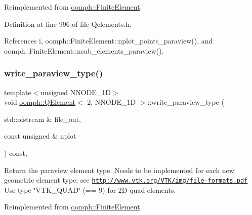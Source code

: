 Reimplemented from \hyperlink{classoomph_1_1FiniteElement_afed006dd5b9ab6bd613d8496e6048abf}{oomph\+::\+Finite\+Element}.



Definition at line 996 of file Qelements.\+h.



References i, oomph\+::\+Finite\+Element\+::nplot\+\_\+points\+\_\+paraview(), and oomph\+::\+Finite\+Element\+::nsub\+\_\+elements\+\_\+paraview().

\mbox{\label{classoomph_1_1QElement_3_012_00_01NNODE__1D_01_4_a2e5c926cfb3b0cf3ef0d199ac4707c21}} 
\subsubsection{\texorpdfstring{write\+\_\+paraview\+\_\+type()}{write\_paraview\_type()}}
{\footnotesize\ttfamily template$<$unsigned N\+N\+O\+D\+E\+\_\+1D$>$ \\
void \hyperlink{classoomph_1_1QElement}{oomph\+::\+Q\+Element}$<$ 2, N\+N\+O\+D\+E\+\_\+1D $>$\+::write\+\_\+paraview\+\_\+type (\begin{DoxyParamCaption}\item[{std\+::ofstream \&}]{file\+\_\+out,  }\item[{const unsigned \&}]{nplot }\end{DoxyParamCaption}) const\hspace{0.3cm}{\ttfamily [inline]}, {\ttfamily [virtual]}}



Return the paraview element type. Needs to be implemented for each new geometric element type; see \href{http://www.vtk.org/VTK/img/file-formats.pdf}{\tt http\+://www.\+vtk.\+org/\+V\+T\+K/img/file-\/formats.\+pdf} Use type \char`\"{}\+V\+T\+K\+\_\+\+Q\+U\+A\+D\char`\"{} (== 9) for 2D quad elements. 



Reimplemented from \hyperlink{classoomph_1_1FiniteElement_a68f0f8dc76f04e7d69983ec711b4ab08}{oomph\+::\+Finite\+Element}.



